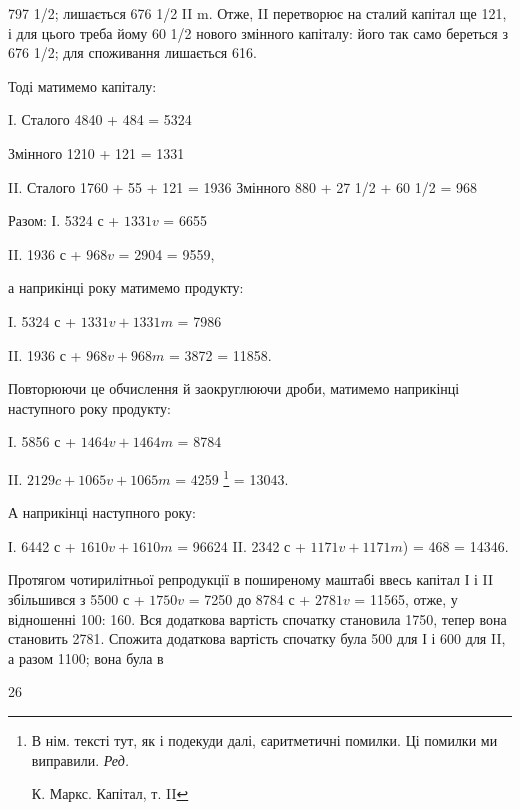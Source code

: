 \parcont{}  %
797 1/2; лишається 676 1/2 II m. Отже, II перетворює на сталий капітал
ще 121, і для цього треба йому 60 1/2 нового змінного капіталу: його
так само береться з 676 1/2; для споживання лишається 616.

Тоді матимемо капіталу:

I. Сталого 4840 + 484 = 5324

Змінного 1210 + 121 = 1331

II. Сталого 1760 + 55 + 121 = 1936
Змінного 880 + 27 1/2 + 60 1/2 = 968

Разом: І. 5324 с + $1331 v$ = 6655

II. 1936 с + $968 v$ = 2904
= 9559,

а наприкінці року матимемо продукту:

I.    5324 с + $1331 v + 1331 m$ = 7986

II.    1936 с + $968 v + 968 m$ = 3872
= 11858.

Повторюючи це обчислення й заокруглюючи дроби, матимемо наприкінці
наступного року продукту:

I.    5856 с + $1464 v + 1464 m$ = 8784

II.    $2129 c + 1065 v + 1065 m$ = 4259 \footnote*{
В нім. тексті тут, як і подекуди далі, єаритметичні помилки. Ці помилки ми
виправили. \emph{Ред.}

К. Маркс. Капітал, т. II
}
= 13043.

А наприкінці наступного року:

І. 6442 с + $1610 v + 1610 m$ = 96624
II. 2342 с + $1171 v + 1171 m$) = 468
= 14346.

Протягом чотирилітньої репродукції в поширеному маштабі ввесь
капітал І і II збільшився з 5500 с + $1750 v$ = 7250 до 8784 с + $2781 v$ =
11565, отже, у відношенні 100: 160. Вся додаткова вартість спочатку
становила 1750, тепер вона становить 2781. Спожита додаткова вартість
спочатку була 500 для І і 600 для II, а разом 1100; вона була в

26
\parbreak{}  %
